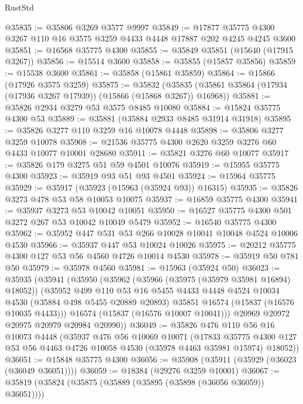\begin{lexlean}{RustStd}
\begin{coremodule}
@35835 := @35806 @3269 @3577 @9997
@35849 := @17877 @35775 @4300 @3267 @110 @16 @3575 @3259 @4433 @4448 @17887 @202 @4245 @4245 @3600
@35851 := @16568 @35775 @4300
@35855 := @35849 @35851 (@15640 (@17915 @3267))
@35856 := @15514 @3600
@35858 := @35855 (@15857 @35856)
@35859 := @15538 @3600
@35861 := @35858 (@15861 @35859)
@35864 := @15866 (@17926 @3575 @3259)
@35875 := @35832
    (@35835 (@35861 @35864 (@17934 (@17936 @3267 @17939)) (@15866 (@15868 @3267)) @16968))
@35881 := @35826 @2934 @3279 @53 @3575 @8485 @10080
@35884 := @15824 @35775 @4300 @53
@35889 := @35881 (@35884 @2933 @8485 @31914 @31918)
@35895 := @35826 @3277 @110 @3259 @16 @10078 @4448
@35898 := @35806 @3277 @3259 @10078
@35908 := @21536 @35775 @4300 @2620 @3259 @3276 @60 @4433 @10077 @10001 @28680
@35911 := @35821 @3276 @60 @10077
@35917 := @35826 @179 @3275 @51 @59 @4501 @10076
@35919 := @15955 @35775 @4300
@35923 := @35919 @93 @51 @93 @4501
@35924 := @15964 @35775
@35929 := @35917 (@35923 (@15963 (@35924 @93)) @16315)
@35935 := @35826 @3273 @478 @53 @58 @10053 @10075
@35937 := @16859 @35775 @4300
@35941 := @35937 @3273 @53 @10042 @10051
@35950 := @16527 @35775 @4300 @501 @3272 @267 @53 @10042 @10049 @5479
@35952 := @16540 @35775 @4300
@35962 := @35952 @447 @531 @53 @266 @10028 @10041 @10048 @4524 @10006 @4530
@35966 := @35937 @447 @53 @10024 @10026
@35975 := @20212 @35775 @4300 @127 @53 @56 @4560 @4726 @10014 @4530
@35978 := @35919 @50 @781 @50
@35979 := @35978 @4560
@35981 := @15963 (@35924 @50)
@36023 := @35935
    (@35941
      (@35950
        (@35962
          (@35966 (@35975 (@35979 @35981 @16894) @18052))
          (@35952
            @499
            @110
            @53
            @16
            @5455
            @4433
            @4448
            @4524
            @10034
            @4530
            (@35884 @498 @5455 @20889 @20893)
            @35851
            @16574
            (@15837 (@16576 @10035 @4433)))
          @16574
          (@15837 (@16576 @10007 @10041)))
        @20969
        @20972
        @20975
        @20979
        @20984
        @20990))
@36049 := @35826
    @476
    @110
    @56
    @16
    @10073
    @4448
    (@35937
      @476
      @56
      @10069
      @10071
      (@17833
        @35775
        @4300
        @127
        @53
        @56
        @4463
        @4726
        @10058
        @4530
        (@35978 @4463 @35981 @15974)
        @18052))
@36051 := @15848 @35775 @4300
@36056 := @35908 (@35911 (@35929 (@36023 (@36049 @36051))))
@36059 := @18384 (@29276 @3259 @10001)
@36067 := @35819 (@35824 (@35875 (@35889 (@35895 (@35898 (@36056 @36059)) @36051))))

\end{coremodule}
\end{lexlean}
